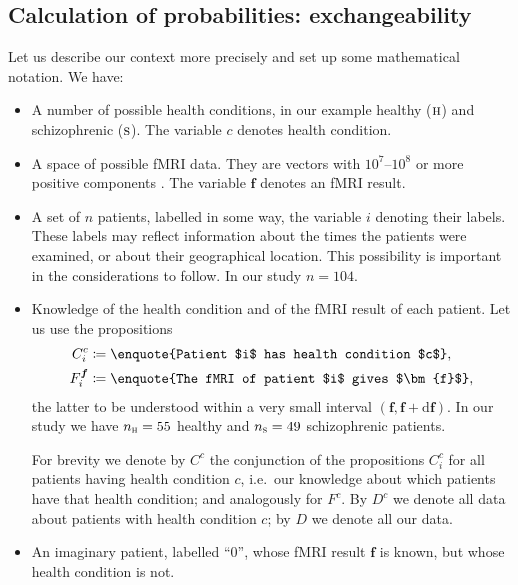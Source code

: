 \documentclass[%
]{frontiersSCNS-nologo} %
\newcommand*{\ie}{i.e.}
\newcommand*{\defd}{\coloneqq}%
\newcommand*{\di}{\mathrm{d}}%
\renewcommand*{\|}{\mathpunct{|}}%
\newcommand*{\yH}{C}
\newcommand*{\yh}{c}
\newcommand*{\yhu}{\textsc{h}}
\newcommand*{\yhd}{\textsc{s}}
\newcommand*{\yD}{D}
\newcommand*{\yF}{F}
\newcommand*{\yf}{\bm{f}}
\newcommand*{\yn}{n}
\newcommand*{\ynh}{\yn_{\yhu}}
\newcommand*{\yns}{\yn_{\yhd}}
\begin{document}
\subsection{Calculation of probabilities: exchangeability}
\label{sec:exchangeability}
Let us describe our context more precisely and set up some mathematical
notation. We have:
\begin{itemize}[para]
\item A number of possible health conditions, in our example healthy
  ($\yhu$) and schizophrenic ($\yhd$). The variable $\yh$ denotes health
  condition.

\item A space of possible fMRI data. They are vectors with $10^7$--$10^8$
  or more positive components \citep{lindquist2008}. The variable $\yf$
  denotes an fMRI result.

\item A set of $\yn$ patients, labelled in some way, the variable $i$
  denoting their labels. These labels may reflect information about the times
  the patients were examined, or about their geographical location. This
  possibility is important in the considerations to follow. In our study
  $\yn = 104$.

\item Knowledge of the health condition and of the fMRI result of each
  patient. Let us use the propositions
  \begin{equation}
    \label{eq:propositions_H_F}
    \begin{aligned}
      \yH_i^{\yh} &\defd \text{\enquote{Patient $i$ has
                    health condition $\yh$}},
      \\
      \yF_i^{\yf} &\defd \text{\enquote{The fMRI of
    patient $i$ gives $\yf$}},
    \end{aligned}
  \end{equation}
  the latter to be understood within a very small interval
  $(\yf,\yf+\di\yf)$. 
  In our study we have
  $\ynh=55$ healthy and $\yns=49$ schizophrenic patients.

  For brevity we denote by $\yH^{\yh}$ the conjunction of the propositions
  $\yH_i^{\yh}$ for all patients having health condition $\yh$, \ie\ our
  knowledge about which patients have that health condition; and
  analogously for $\yF^{\yh}$. By $\yD^{\yh}$ we denote all data about
  patients with health condition $\yh$; by $\yD$ we denote all our data.
 

\item An imaginary patient, labelled \enquote{$0$}, whose fMRI result $\yf$
  is known, but whose health condition is not.


\end{itemize}
\end{document}
